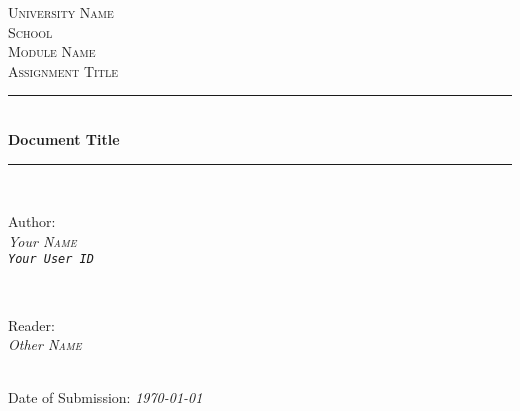 \begin{titlepage}
	\newcommand{\Hrule}{\rule{\linewidth}{0.7mm}} %

	\center %

	\textsc{\LARGE University Name}\\[0.5cm] %
	\textsc{\large School}\\[1cm]
	\textsc{\Large Module Name}\\[0.5cm] %
	\textsc{\large Assignment Title}\\[0.5cm] %

	\Hrule \\[0.4cm]
	{ \huge \bfseries Document Title}\\[0.4cm] %
	\Hrule \\[1.5cm]

	\begin{minipage}{0.4\textwidth}
		\begin{flushleft} \large
			Author:\\
			\textit{Your \textsc{Name}}\\ %
			\textit{\texttt{Your User ID}}
		\end{flushleft}
	\end{minipage}
	~
	\begin{minipage}{0.4\textwidth}
		\begin{flushright} \large
			Reader:\\
			\textit{Other \textsc{Name}} %
		\end{flushright}
	\end{minipage}\\[4cm]


	{\large Date of Submission: \textit{\today}}\\[3cm] %


	\vfill %
\end{titlepage}
